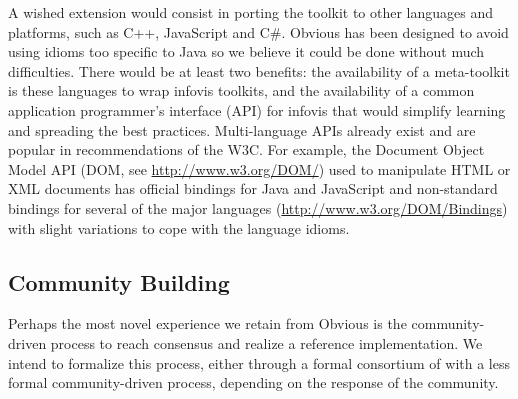 A wished extension would consist in porting the toolkit to other
languages and platforms, such as C++, JavaScript and C\#.  Obvious has
been designed to avoid using idioms too specific to Java so we believe
it could be done without much difficulties.  There would be at least
two benefits: the availability of a meta-toolkit is these languages to
wrap infovis toolkits, and the availability of a common application
programmer's interface (API) for infovis that would simplify learning
and spreading the best practices.  Multi-language APIs already exist
and are popular in recommendations of the W3C. For example, the
Document Object Model API (DOM, see \url{http://www.w3.org/DOM/}) used
to manipulate HTML or XML documents has official bindings for Java and
JavaScript and non-standard bindings for several of the major
languages (\url{http://www.w3.org/DOM/Bindings}) with slight
variations to cope with the language idioms.

\begin{comment}
This
endeavor raises some new challenges: each language and platforms
supposes some specific idioms that are hardly translatable in concepts
of the other languages. Java has a generic collection type, for
instance, that does not map to a standard equivalent in C++. In
translating the design verbatim from a language to another, we would
insure some level of compatibility, but at the expense of
idiosyncrasies in our library, which would preclude widespread
adoption in our target languages. Conversely, adopting the target
language's idioms would preclude interoperability of the Obvious
platform across languages.
\end{comment}

\subsection{Community Building}

Perhaps the most novel experience we retain from Obvious is the
community-driven process to reach consensus and realize a reference
implementation.  We intend to formalize this process, either through a
formal consortium of with a less formal community-driven process,
depending on the response of the community.

